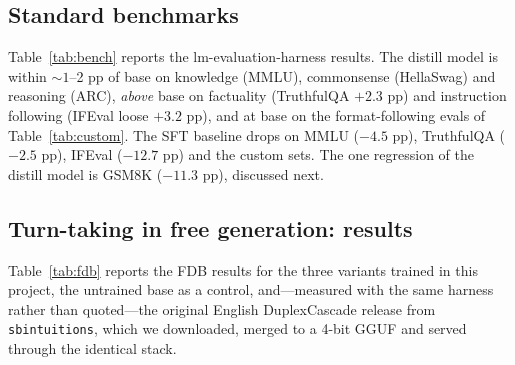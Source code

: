 \documentclass[conference]{IEEEtran}
\begin{document}
\subsection{Standard benchmarks}
Table~\ref{tab:bench} reports the lm-evaluation-harness results. The distill model is
within ${\sim}1$--2 pp of base on knowledge (MMLU), commonsense (HellaSwag) and
reasoning (ARC), \emph{above} base on factuality (TruthfulQA $+2.3$ pp) and
instruction following (IFEval loose $+3.2$ pp), and at base on the format-following
evals of Table~\ref{tab:custom}. The SFT baseline drops on MMLU ($-4.5$ pp),
TruthfulQA ($-2.5$ pp), IFEval ($-12.7$ pp) and the custom sets. The one regression
of the distill model is GSM8K ($-11.3$ pp), discussed next.

\begin{table}[t]
\centering
\caption{Standard benchmarks (lm-evaluation-harness 0.4.12; subsets as noted).}
\label{tab:bench}
\footnotesize
{}
\end{table}

\subsection{Turn-taking in free generation: results}
\label{sec:fdb_results}
Table~\ref{tab:fdb} reports the FDB results for the three variants trained in this
project, the untrained base as a control, and---measured with the same harness
rather than quoted---the original English DuplexCascade release from
\texttt{sbintuitions}, which we downloaded, merged to a 4-bit GGUF and served
through the identical stack.
\end{document}
